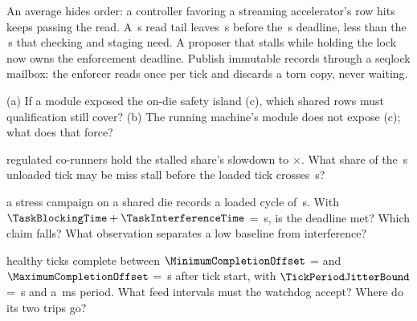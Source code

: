 \documentclass{studysheet}
\newcommand{\us}{\,\textmu s}
\begin{document}
\begin{rightcol}
%
  {An average hides order: a controller favoring a streaming accelerator's row hits keeps passing the read. A \us{} read tail leaves \us{} before the \us{} deadline,
   less than the \us{} that checking and staging need.}{}
%
  {A proposer that stalls while holding the lock now owns the enforcement deadline. Publish immutable
   records through a seqlock mailbox: the enforcer reads once per tick and discards a torn copy, never waiting.}{}

\vspace{2pt}
\begin{qs}
\item (a) If a module exposed the on-die safety island (c), which shared rows must qualification still
  cover? (b) The running machine's module does not expose (c); what does that force?
\item \assumed{} regulated co-runners hold the stalled share's slowdown to $\times$. What share of
  the \us{} unloaded tick may be miss stall before the loaded tick crosses \us?
\item \assumed{} a stress campaign on a shared die records a loaded cycle of \us.
  With $\TaskBlockingTime + \TaskInterferenceTime$ = \us, is the deadline met? Which claim falls?
  What observation separates a low baseline from interference?
\item \assumed{} healthy ticks complete between $\MinimumCompletionOffset$ =  and
  $\MaximumCompletionOffset$ = \us{} after tick start, with $\TickPeriodJitterBound$ = \us{} and a
  \,ms period. What feed intervals must the watchdog accept? Where do its two trips go?
\end{qs}
\end{rightcol}
\end{document}
